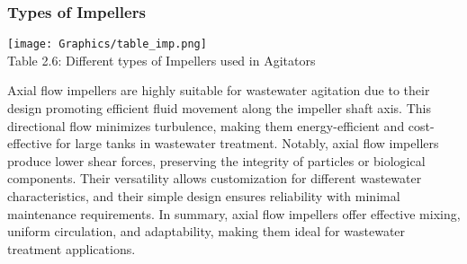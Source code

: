 \documentclass[a4,10pt]{report}
\begin{document}
\subsubsection{Types of Impellers}

\begin{center}
    \texttt{[image: Graphics/table\_imp.png]} \\ 
    \normalsize{Table 2.6: Different types of Impellers used in Agitators} \\
\end{center}

Axial flow impellers are highly suitable for wastewater agitation due to their design promoting efficient fluid movement along the impeller shaft axis. This directional flow minimizes turbulence, making them energy-efficient and cost-effective for large tanks in wastewater treatment. Notably, axial flow impellers produce lower shear forces, preserving the integrity of particles or biological components. Their versatility allows customization for different wastewater characteristics, and their simple design ensures reliability with minimal maintenance requirements. In summary, axial flow impellers offer effective mixing, uniform circulation, and adaptability, making them ideal for wastewater treatment applications.
\end{document}
